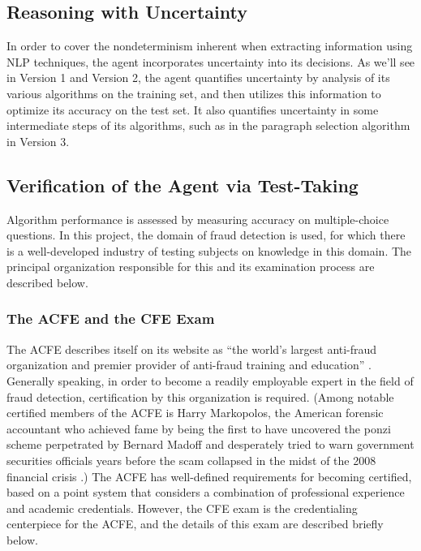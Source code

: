 \subsection{Reasoning with Uncertainty}

In order to cover the nondeterminism inherent when extracting information using NLP techniques, the agent incorporates uncertainty into its decisions.  As we'll see in Version 1 and Version 2, the agent quantifies uncertainty by analysis of its various algorithms on the training set, and then utilizes this information to optimize its accuracy on the test set.  It also quantifies uncertainty in some intermediate steps of its algorithms, such as in the paragraph selection algorithm in Version 3.

\subsection{Verification of the Agent via Test-Taking}

Algorithm performance is assessed by measuring accuracy on multiple-choice questions.  In this project, the domain of fraud detection is used, for which there is a well-developed industry of testing subjects on knowledge in this domain.  The principal organization responsible for this and its examination process are described below.

\subsubsection{The ACFE and the CFE Exam}


The ACFE \cite{acfe} describes itself on its website as ``the world's largest anti-fraud organization and premier provider of anti-fraud training and education'' \cite{acfe}.  Generally speaking, in order to become a readily employable expert in the field of fraud detection, certification by this organization is required.  (Among notable certified members of the ACFE is Harry Markopolos, the American forensic accountant who achieved fame by being the first to have uncovered the ponzi scheme perpetrated by Bernard Madoff and desperately tried to warn government securities officials years before the scam collapsed in the midst of the 2008 financial crisis \cite{markopolos2010}.)  The ACFE has well-defined requirements for becoming certified, based on a point system that considers a combination of professional experience and academic credentials.  However, the CFE exam is the credentialing centerpiece for the ACFE, and the details of this exam are described briefly below.

